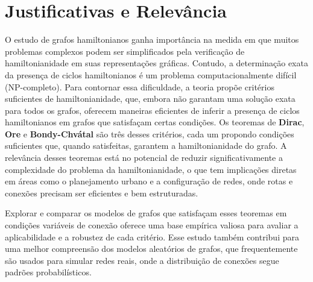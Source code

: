 \documentclass[12pt, openright, oneside, a4paper, chapter=TITLE, section=TITLE, subsection=TITLE, subsubsection=TITLE, brazil]{abntex2}
\begin{document}
\section{Justificativas e Relevância}
O estudo de grafos hamiltonianos ganha importância na medida em que muitos problemas complexos podem ser simplificados pela verificação de hamiltonianidade em suas representações gráficas. Contudo, a determinação exata da presença de ciclos hamiltonianos é um problema computacionalmente difícil (NP-completo). Para contornar essa dificuldade, a teoria propõe critérios suficientes de hamiltonianidade, que, embora não garantam uma solução exata para todos os grafos, oferecem maneiras eficientes de inferir a presença de ciclos hamiltonianos em grafos que satisfaçam certas condições. Os teoremas de \textbf{Dirac}, \textbf{Ore} e \textbf{Bondy-Chvátal} são três desses critérios, cada um propondo condições suficientes que, quando satisfeitas, garantem a hamiltonianidade do grafo. A relevância desses teoremas está no potencial de reduzir significativamente a complexidade do problema da hamiltonianidade, o que tem implicações diretas em áreas como o planejamento urbano e a configuração de redes, onde rotas e conexões precisam ser eficientes e bem estruturadas.

Explorar e comparar os modelos de grafos que satisfaçam esses teoremas em condições variáveis de conexão oferece uma base empírica valiosa para avaliar a aplicabilidade e a robustez de cada critério. Esse estudo também contribui para uma melhor compreensão dos modelos aleatórios de grafos, que frequentemente são usados para simular redes reais, onde a distribuição de conexões segue padrões probabilísticos.
\end{document}
